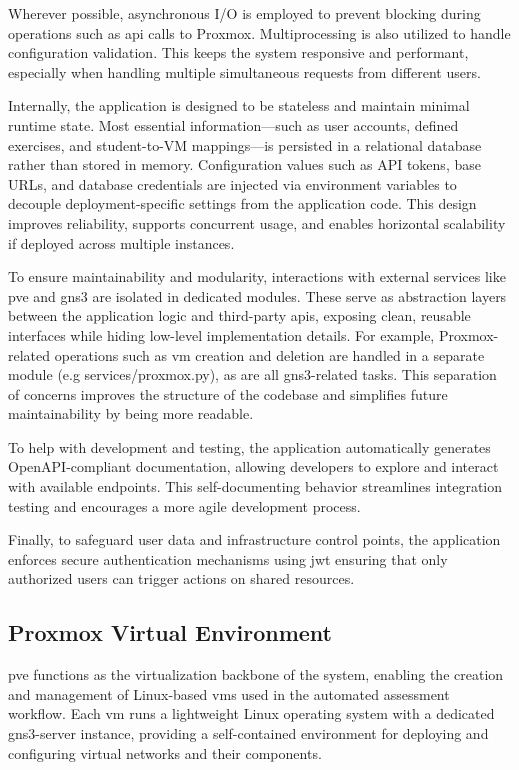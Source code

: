 Wherever possible, asynchronous I/O is employed to prevent blocking during operations such as \ac{api} calls to Proxmox.
Multiprocessing is also utilized to handle configuration validation. This keeps the system responsive and performant, 
especially when handling multiple simultaneous requests from different users.

Internally, the application is designed to be stateless and maintain minimal runtime state.  Most essential information—such 
as user accounts, defined exercises, and student-to-VM mappings—is persisted in a relational database rather than stored in 
memory. Configuration values such as API tokens, base URLs, and database credentials are injected via environment variables 
to decouple deployment-specific settings from the application code. This design improves reliability, supports concurrent 
usage, and enables horizontal scalability if deployed across multiple instances. 

To ensure maintainability and modularity, interactions with external services like \ac{pve} and \ac{gns3} are isolated in 
dedicated modules. These serve as abstraction layers between the application logic and third-party \ac{api}s, exposing clean, 
reusable interfaces while hiding low-level implementation details. For example, Proxmox-related operations such as \ac{vm} 
creation and deletion are handled in a separate module (e.g services/proxmox.py), as are all \ac{gns3}-related tasks. This 
separation of concerns improves the structure of the codebase and simplifies future maintainability by being more readable.

To help with development and testing, the application automatically generates OpenAPI-compliant documentation, allowing 
developers to explore and interact with available endpoints. This self-documenting behavior streamlines integration 
testing and encourages a more agile development process.

Finally, to safeguard user data and infrastructure control points, the application enforces secure authentication mechanisms 
using \ac{jwt} ensuring that only authorized users can trigger actions on shared resources. 

\subsection{Proxmox Virtual Environment}
\ac{pve} functions as the virtualization backbone of the system, enabling the creation and management of Linux-based \ac{vm}s 
used in the automated assessment workflow. Each \ac{vm} runs a lightweight Linux operating system with a dedicated 
\ac{gns3}-server instance, providing a self-contained environment for deploying and configuring virtual networks and their 
components.

